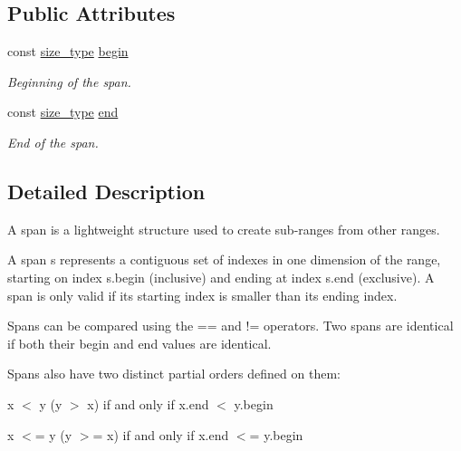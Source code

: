 \subsection*{Public Attributes}
\begin{DoxyCompactItemize}
\item 
\mbox{\label{structgko_1_1span_a54ff06eda27a98b62e83c7e9e7b6dcd7}} 
const \hyperlink{namespacegko_a6e5c95df0ae4e47aab2f604a22d98ee7}{size\+\_\+type} \hyperlink{structgko_1_1span_a54ff06eda27a98b62e83c7e9e7b6dcd7}{begin}
\begin{DoxyCompactList}\small\item\em Beginning of the span. \end{DoxyCompactList}\item 
\mbox{\label{structgko_1_1span_af68200dea4456e1bd3511c3b14bc2886}} 
const \hyperlink{namespacegko_a6e5c95df0ae4e47aab2f604a22d98ee7}{size\+\_\+type} \hyperlink{structgko_1_1span_af68200dea4456e1bd3511c3b14bc2886}{end}
\begin{DoxyCompactList}\small\item\em End of the span. \end{DoxyCompactList}\end{DoxyCompactItemize}


\subsection{Detailed Description}
A span is a lightweight structure used to create sub-\/ranges from other ranges. 

A {\ttfamily span s} represents a contiguous set of indexes in one dimension of the range, starting on index {\ttfamily s.\+begin} (inclusive) and ending at index {\ttfamily s.\+end} (exclusive). A span is only valid if its starting index is smaller than its ending index.

Spans can be compared using the {\ttfamily ==} and {\ttfamily !=} operators. Two spans are identical if both their {\ttfamily begin} and {\ttfamily end} values are identical.

Spans also have two distinct partial orders defined on them\+:
\begin{DoxyEnumerate}
\item {\ttfamily x $<$ y} ({\ttfamily y $>$ x}) if and only if {\ttfamily x.\+end $<$ y.\+begin}
\item {\ttfamily x $<$= y} ({\ttfamily y $>$= x}) if and only if {\ttfamily x.\+end $<$= y.\+begin}
\end{DoxyEnumerate}

